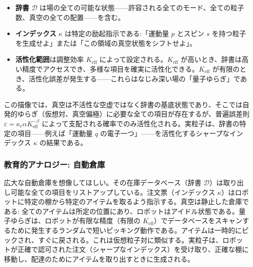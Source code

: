 \documentclass[12pt,a4paper]{article}
\theoremstyle{definition}
\theoremstyle{remark}
\begin{document}
	\begin{itemize}[leftmargin=*]
		\item \textbf{辞書} $\mathcal{D}$ は場の全ての可能な状態——許容される全てのモード、全ての粒子数、真空の全ての配置——を含む。
		\item \textbf{インデックス} $\kappa$ は特定の励起指示である:「運動量 $p$ とスピン $s$ を持つ粒子を生成せよ」または「この領域の真空状態をシフトせよ」。
		\item \textbf{活性化範囲}は調整効率 $K_{\mathrm{eff}}$ によって設定される。$K_{\mathrm{eff}}$ が高いとき、辞書は高い精度でアクセスでき、多様な項目を確実に活性化できる。$K_{\mathrm{eff}}$ が有限のとき、活性化誤差が発生する——これらはなじみ深い場の「量子ゆらぎ」である。
	\end{itemize}
	
	この描像では、真空は不活性な空虚ではなく辞書の基底状態であり、そこでは自発的ゆらぎ（仮想対、真空偏極）に必要な全ての項目が存在するが、普遍誤差則 $\varepsilon = \kappa_c \alpha K_{\mathrm{eff}}^{-\beta}$ によって支配される確率でのみ活性化される。実粒子は、辞書の特定の項目——例えば「運動量 $q$ の電子一つ」——を活性化するシャープなインデックス $\kappa$ の結果である。
	
	\subsubsection{教育的アナロジー: 自動倉庫}
	
	広大な自動倉庫を想像してほしい。その在庫データベース（辞書 $\mathcal{D}$）は取り出し可能な全ての項目をリストアップしている。注文票（インデックス $\kappa$）はロボットに特定の棚から特定のアイテムを取るよう指示する。真空は静止した倉庫である: 全てのアイテムは所定の位置にあり、ロボットはアイドル状態である。量子ゆらぎは、ロボットが有限な精度（有限の $K_{\mathrm{eff}}$）でデータベースをスキャンするために発生するランダムで短いピッキング動作である。アイテムは一時的にピックされ、すぐに戻される。これは仮想粒子対に類似する。実粒子は、ロボットが正確で認可された注文（シャープなインデックス）を受け取り、正確な棚に移動し、配達のためにアイテムを取り出すときに生成される。
	
	\medskip
	
\end{document}
